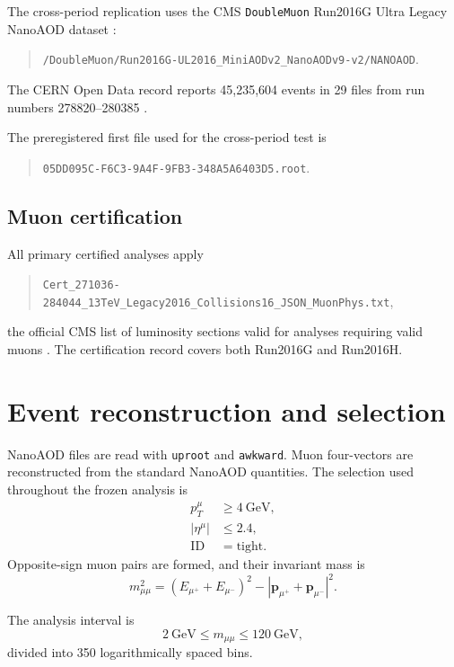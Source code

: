 \documentclass[11pt]{article}
\begin{document}
The cross-period replication uses the CMS
\texttt{DoubleMuon} Run2016G Ultra Legacy NanoAOD dataset
\cite{CMS2016G}:
\begin{quote}
\texttt{/DoubleMuon/Run2016G-UL2016\_MiniAODv2\_NanoAODv9-v2/NANOAOD}.
\end{quote}
The CERN Open Data record reports 45,235,604 events in 29 files from run
numbers 278820--280385 \cite{CMS2016G}.

The preregistered first file used for the cross-period test is
\begin{quote}
\texttt{05DD095C-F6C3-9A4F-9FB3-348A5A6403D5.root}.
\end{quote}

\subsection{Muon certification}

All primary certified analyses apply
\begin{quote}
\texttt{Cert\_271036-284044\_13TeV\_Legacy2016\_Collisions16\_JSON\_MuonPhys.txt},
\end{quote}
the official CMS list of luminosity sections valid for analyses requiring
valid muons \cite{CMSMuonJSON}.  The certification record covers both
Run2016G and Run2016H.

\section{Event reconstruction and selection}

NanoAOD files are read with \texttt{uproot} and \texttt{awkward}.  Muon
four-vectors are reconstructed from the standard NanoAOD quantities.  The
selection used throughout the frozen analysis is
\begin{align}
p_T^\mu &\ge 4~\mathrm{GeV},\\
|\eta^\mu| &\le 2.4,\\
\text{ID} &= \text{tight}.
\end{align}
Opposite-sign muon pairs are formed, and their invariant mass is
\begin{equation}
m_{\mu\mu}^2
=
(E_{\mu^+}+E_{\mu^-})^2
-
\left|
\mathbf{p}_{\mu^+}+\mathbf{p}_{\mu^-}
\right|^2.
\end{equation}

The analysis interval is
\begin{equation}
2~\mathrm{GeV}
\le m_{\mu\mu}\le
120~\mathrm{GeV},
\end{equation}
divided into 350 logarithmically spaced bins.
\end{document}
